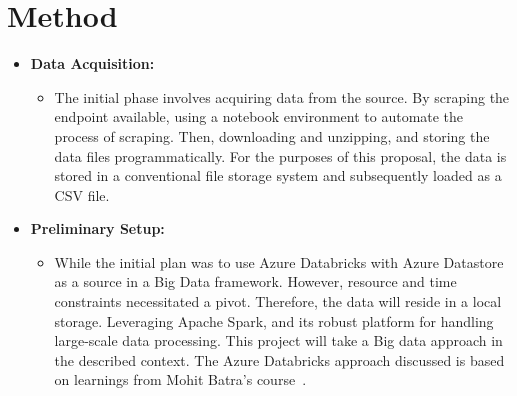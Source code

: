 \documentclass[12pt, a4paper]{article}
\begin{document}
    \section*{Method}
    \label{sec:method}
    \begin{itemize}
        \item \textbf{Data Acquisition:}
        \begin{itemize}
            \item The initial phase involves acquiring data from the source.\newline
            By scraping the endpoint available, using a notebook environment to automate the process of scraping. Then, downloading and unzipping, and storing the data files programmatically.\newline
            For the purposes of this proposal, the data is stored in a conventional file storage system and subsequently loaded as a CSV file.
        \end{itemize}

        \item \textbf{Preliminary Setup:}
        \begin{itemize}
            \item While the initial plan was to use Azure Databricks with Azure Datastore as a source in a Big Data framework. However, resource and time constraints necessitated a pivot. Therefore, the data will reside in a local storage.
            \newline Leveraging Apache Spark, and its robust platform for handling large-scale data processing. This project will take a Big data approach in the described context.
            \newline The Azure Databricks approach discussed is based on learnings from Mohit Batra's course~\cite{Batra2022}.
        \end{itemize}


\end{itemize}
\end{document}
